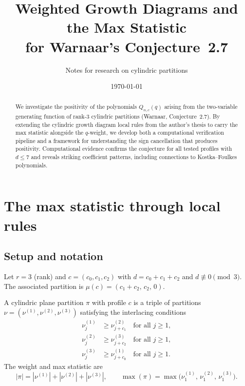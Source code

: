 \documentclass[11pt]{article}
\title{Weighted Growth Diagrams and the Max Statistic\\
for Warnaar's Conjecture~2.7}
\author{Notes for research on cylindric partitions}
\date{\today}
\begin{document}
\maketitle

\begin{abstract}
We investigate the positivity of the polynomials $Q_{n,c}(q)$ arising
from the two-variable generating function of rank-3 cylindric partitions
(Warnaar, Conjecture~2.7). By extending the cylindric growth diagram
local rules from the author's thesis to carry the max statistic alongside
the $q$-weight, we develop both a computational verification pipeline and
a framework for understanding the sign cancellation that produces positivity.
Computational evidence confirms the conjecture for all tested profiles with
$d \leq 7$ and reveals striking coefficient patterns, including connections
to Kostka--Foulkes polynomials.
\end{abstract}

\tableofcontents

\section{The max statistic through local rules}
\label{sec:max-local-rules}

\subsection{Setup and notation}

Let $r = 3$ (rank) and $c = (c_0, c_1, c_2)$ with $d = c_0 + c_1 + c_2$
and $d \not\equiv 0 \pmod{3}$. The associated partition is
$\mu(c) = (c_1 + c_2,\, c_2,\, 0)$.

A cylindric plane partition $\pi$ with profile $c$ is a triple of partitions
$\nu = (\nu^{(1)}, \nu^{(2)}, \nu^{(3)})$ satisfying the interlacing conditions
\begin{align}
  \nu^{(1)}_j &\geq \nu^{(2)}_{j+c_1} \quad \text{for all } j \geq 1, \label{eq:interlace1} \\
  \nu^{(2)}_j &\geq \nu^{(3)}_{j+c_2} \quad \text{for all } j \geq 1, \label{eq:interlace2} \\
  \nu^{(3)}_j &\geq \nu^{(1)}_{j+c_0} \quad \text{for all } j \geq 1. \label{eq:interlace3}
\end{align}
The weight and max statistic are
\[
  |\pi| = |\nu^{(1)}| + |\nu^{(2)}| + |\nu^{(3)}|,
  \qquad
  \max(\pi) = \max\bigl(\nu^{(1)}_1,\, \nu^{(2)}_1,\, \nu^{(3)}_1\bigr).
\]
\end{document}
